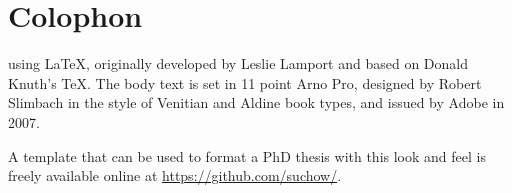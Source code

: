 \chapter*{Colophon}
\parbox{200pt}{\raggedright{} using \LaTeX, originally developed by Leslie Lamport and based on Donald Knuth's \TeX. The body text is set in 11 point Arno Pro, designed by Robert Slimbach in the style of Venitian and Aldine book types, and issued by Adobe in 2007.

A template that can be used to format a PhD thesis with this look and feel is freely available online at \url{https://github.com/suchow/}.

}